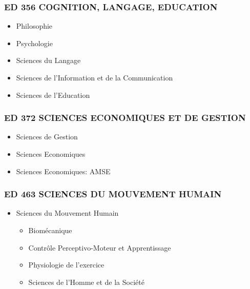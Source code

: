 \subsubsection*{ED 356 COGNITION, LANGAGE, EDUCATION}\label{ed-356-cognition-langage-education}

\begin{itemize}
\item
  Philosophie
\item
  Psychologie
\item
  Sciences du Langage
\item
  Sciences de l'Information et de la Communication
\item
  Sciences de l'Education
\end{itemize}

\subsubsection*{ED 372 SCIENCES ECONOMIQUES ET DE GESTION}\label{ed-372-sciences-economiques-et-de-gestion}

\begin{itemize}
\item
  Sciences de Gestion
\item
  Sciences Economiques
\item
  Sciences Economiques: AMSE
\end{itemize}

\subsubsection*{ED 463 SCIENCES DU MOUVEMENT HUMAIN}\label{ed-463-sciences-du-mouvement-humain}

\begin{itemize}
\item
Sciences du Mouvement Humain
\begin{itemize}
\item Biomécanique
\item Contrôle Perceptivo-Moteur et Apprentissage
\item Physiologie de l'exercice
\item Sciences de l'Homme et de la Société
\end{itemize}
\end{itemize}
